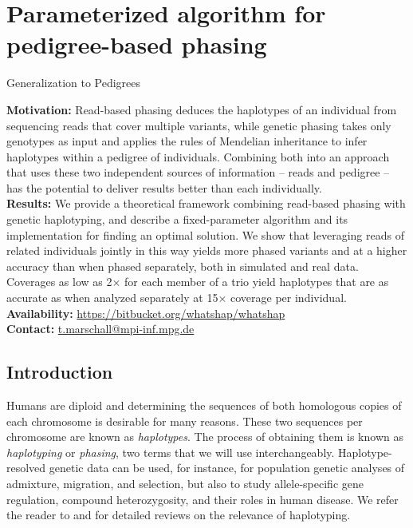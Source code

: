 \chapter{Parameterized algorithm for pedigree-based phasing}
Generalization to Pedigrees

\textbf{Motivation:}
Read-based phasing deduces the haplotypes of an individual from sequencing reads that cover multiple variants, while genetic phasing takes only genotypes as input and applies the rules of Mendelian inheritance to infer haplotypes within a pedigree of individuals.
Combining both into an approach that uses these two independent sources of information -- reads and pedigree -- has the potential to deliver results better than each individually.\\
\textbf{Results:}
We provide a theoretical framework combining read-based phasing with genetic haplotyping, and describe a fixed-parameter algorithm and its implementation for finding an optimal solution.
We show that leveraging reads of related individuals jointly in this way yields more phased variants and at a higher accuracy than when phased separately, both in simulated and real data.
Coverages as low as 2$\times$ for each member of a trio yield haplotypes that are as accurate as when analyzed separately at 15$\times$ coverage per individual.
\\
\textbf{Availability:} \href{https://bitbucket.org/whatshap/whatshap}{https://bitbucket.org/whatshap/whatshap} \\
\textbf{Contact:} \href{t.marschall@mpi-inf.mpg.de}{t.marschall@mpi-inf.mpg.de}\\




\section{Introduction}\label{sec:intro}
Humans are diploid and determining the sequences of both homologous copies of each chromosome is desirable for many reasons.
These two sequences per chromosome are known as \emph{haplotypes}.
The process of obtaining them is known as \emph{haplotyping} or \emph{phasing}, two terms that we will use interchangeably.
Haplotype-resolved genetic data can be used, for instance, for population genetic analyses of admixture, migration, and selection, but also to study allele-specific gene regulation, compound heterozygosity, and their roles in human disease.
We refer the reader to \cite{Tewhey2011} and \cite{Glusman2014} for detailed reviews on the relevance of haplotyping.


